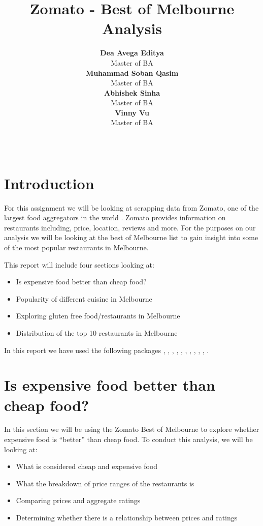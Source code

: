 \documentclass[11pt,a4paper,]{article}
\title{Zomato - Best of Melbourne Analysis}
\author{\sf\Large\textbf{ Dea Avega Editya}\\ {\sf\large Master of BA\\[0.5cm]} \sf\Large\textbf{ Muhammad Soban Qasim}\\ {\sf\large Master of BA\\[0.5cm]} \sf\Large\textbf{ Abhishek Sinha}\\ {\sf\large Master of BA\\[0.5cm]} \sf\Large\textbf{ Vinny Vu}\\ {\sf\large Master of BA\\[0.5cm]}}
\date{\sf\Date~\Month~\Year}
\makeatletter
\providecommand{\tightlist}{%
  \setlength{\itemsep}{0pt}\setlength{\parskip}{0pt}}
\def\titlepage{\front{\expandafter{\@title}}{\@author}{\@organization}}
\makeatother
\begin{document}
\titlepage

{
\setcounter{tocdepth}{2}
\tableofcontents
}
\clearpage

\section*{Introduction}

For this assignment we will be looking at scrapping data from Zomato, one of the largest food aggregators in the world \textcite{zomato}. Zomato provides information on restaurants including, price, location, reviews and more. For the purposes on our analysis we will be looking at the best of Melbourne list \textcite{zomatomelb} to gain insight into some of the most popular restaurants in Melbourne.

This report will include four sections looking at:

\begin{itemize}
\tightlist
\item
  Is expensive food better than cheap food?
\item
  Popularity of different cuisine in Melbourne
\item
  Exploring gluten free food/restaurants in Melbourne
\item
  Distribution of the top 10 restaurants in Melbourne
\end{itemize}

In this report we have used the following packages \textcite{tidyverse}, \textcite{romato}, \textcite{kableExtra}, \textcite{knitr}, \textcite{dplyr}, \textcite{ggplot2}, \textcite{leaflet}, \textcite{rgdal}, \textcite{readr}, \textcite{mapview}, \textcite{viridis}.

\section*{Is expensive food better than cheap food?}

In this section we will be using the Zomato Best of Melbourne to explore whether expensive food is ``better'' than cheap food. To conduct this analysis, we will be looking at:

\begin{itemize}
\tightlist
\item
  What is considered cheap and expensive food
\item
  What the breakdown of price ranges of the restaurants is
\item
  Comparing prices and aggregate ratings
\item
  Determining whether there is a relationship between prices and ratings
\end{itemize}
\end{document}
